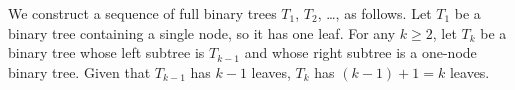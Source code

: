 We construct a sequence of full binary trees $T_1$, $T_2$, \dots, as follows.
Let $T_1$ be a binary tree containing a single node, so it has one leaf.
For any $k\ge2$, let $T_k$ be a binary tree whose left subtree is $T_{k-1}$ and whose right subtree is a one-node binary tree.
Given that $T_{k-1}$ has $k-1$ leaves, $T_k$ has $(k-1)+1=k$ leaves.
